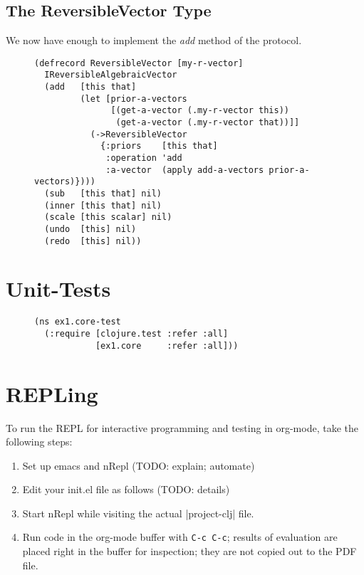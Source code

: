 \documentclass[11pt]{article}
\begin{document}
\subsection{The ReversibleVector Type}
\label{sec-4-6}

We now have enough to implement the \emph{add} method of the protocol.

\begin{figure}[H]
\label{reversible-algebraic-vector}
\begin{verbatim}
(defrecord ReversibleVector [my-r-vector]
  IReversibleAlgebraicVector
  (add   [this that]
         (let [prior-a-vectors
               [(get-a-vector (.my-r-vector this))
                (get-a-vector (.my-r-vector that))]]
           (->ReversibleVector
             {:priors    [this that]
              :operation 'add
              :a-vector  (apply add-a-vectors prior-a-vectors)})))
  (sub   [this that] nil)
  (inner [this that] nil)
  (scale [this scalar] nil)
  (undo  [this] nil)
  (redo  [this] nil))
\end{verbatim}
\end{figure}
\section{Unit-Tests}
\label{sec-5}

\begin{figure}[H]
\label{test-namespace}
\begin{verbatim}
(ns ex1.core-test
  (:require [clojure.test :refer :all]
            [ex1.core     :refer :all]))
\end{verbatim}
\end{figure}
\section{REPLing}
\label{sec-6}
\label{sec:emacs-repl}
To run the REPL for interactive programming and testing in org-mode,
take the following steps:
\begin{enumerate}
\item Set up emacs and nRepl (TODO: explain; automate)
\item Edit your init.el file as follows (TODO: details)
\item Start nRepl while visiting the actual |project-clj| file.
\item Run code in the org-mode buffer with \verb|C-c C-c|; results of
evaluation are placed right in the buffer for inspection; they are
not copied out to the PDF file.
\end{enumerate}
\end{document}
